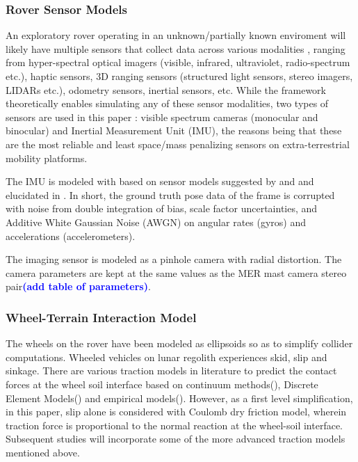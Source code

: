 \documentclass[a4paper, 10pt, conference]{ieeeconf}      %
\newcommand\coltxt[2]{\textbf{\textcolor{#1}{(#2)}}}
\newcommand\msm[1]{\coltxt{blue}{#1}}
\begin{document}
\subsubsection{Rover Sensor Models}
An exploratory rover operating in an unknown/partially known enviroment will likely have multiple sensors that collect data across various modalities \cite{borenstein1997mobile,ruocco2013robot}, ranging from hyper-spectral optical imagers (visible, infrared, ultraviolet, radio-spectrum etc.), haptic sensors, 3D ranging sensors (structured light sensors, stereo imagers, LIDARs etc.), odometry sensors, inertial sensors, etc. While the framework theoretically enables simulating any of these sensor modalities, two types of sensors are used in this paper : visible spectrum cameras (monocular and binocular)  and Inertial Measurement Unit (IMU), the reasons being that these are the most reliable and least space/mass penalizing sensors on extra-terrestrial mobility platforms. 

The IMU is modeled with based on sensor models suggested by \cite{savage1998strapdown1} and \cite{savage1998strapdown2} and elucidated in \cite{titterton2004strapdown}. In short, the ground truth pose data of the frame is corrupted with noise from double integration of bias, scale factor uncertainties, and Additive White Gaussian Noise (AWGN) on angular rates (gyros) and accelerations (accelerometers).

The imaging sensor is modeled as a pinhole camera with radial distortion. The camera parameters are kept at the same values as  the MER mast camera stereo pair\msm{add table of parameters}.
\subsubsection{Wheel-Terrain Interaction Model}
The wheels on the rover have been modeled as ellipsoids so as to simplify collider computations. Wheeled vehicles on lunar regolith experiences skid, slip and sinkage\cite{ding2009slip}. There are various traction models in literature to predict the contact forces at the wheel soil interface based on continuum  methods(\cite{bekker1964mechanics,wong1967behaviour,ding2015interaction}), Discrete Element Models(\cite{yoshida2003terramechanics,jeong2019development,rodriguez2019high,jiang2018experimental,jeong2019development}) and empirical models(\cite{huang2019sinkage,wong2012predicting}).  However, as a first level simplification, in this paper, slip alone is considered with Coulomb dry friction model, wherein traction force is proportional to the normal reaction at the wheel-soil interface. Subsequent studies will incorporate some of the more advanced traction models mentioned above.
\end{document}
